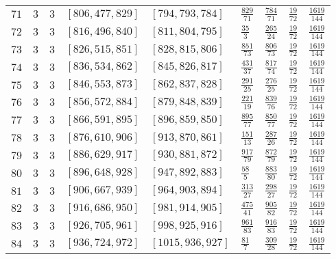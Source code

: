 \documentclass[12pt]{extarticle}
\begin{document}
\begin{longtable}{lllllllll}
$71$ & $3$ & $3$ & $\left[806, 477, 829\right]$ & $\left[794, 793, 784\right]$ & $\frac{829}{71}$ & $\frac{784}{71}$ & $\frac{19}{72}$ & $\frac{1619}{144}$ \\
$72$ & $3$ & $3$ & $\left[816, 496, 840\right]$ & $\left[811, 804, 795\right]$ & $\frac{35}{3}$ & $\frac{265}{24}$ & $\frac{19}{72}$ & $\frac{1619}{144}$ \\
$73$ & $3$ & $3$ & $\left[826, 515, 851\right]$ & $\left[828, 815, 806\right]$ & $\frac{851}{73}$ & $\frac{806}{73}$ & $\frac{19}{72}$ & $\frac{1619}{144}$ \\
$74$ & $3$ & $3$ & $\left[836, 534, 862\right]$ & $\left[845, 826, 817\right]$ & $\frac{431}{37}$ & $\frac{817}{74}$ & $\frac{19}{72}$ & $\frac{1619}{144}$ \\
$75$ & $3$ & $3$ & $\left[846, 553, 873\right]$ & $\left[862, 837, 828\right]$ & $\frac{291}{25}$ & $\frac{276}{25}$ & $\frac{19}{72}$ & $\frac{1619}{144}$ \\
$76$ & $3$ & $3$ & $\left[856, 572, 884\right]$ & $\left[879, 848, 839\right]$ & $\frac{221}{19}$ & $\frac{839}{76}$ & $\frac{19}{72}$ & $\frac{1619}{144}$ \\
$77$ & $3$ & $3$ & $\left[866, 591, 895\right]$ & $\left[896, 859, 850\right]$ & $\frac{895}{77}$ & $\frac{850}{77}$ & $\frac{19}{72}$ & $\frac{1619}{144}$ \\
$78$ & $3$ & $3$ & $\left[876, 610, 906\right]$ & $\left[913, 870, 861\right]$ & $\frac{151}{13}$ & $\frac{287}{26}$ & $\frac{19}{72}$ & $\frac{1619}{144}$ \\
$79$ & $3$ & $3$ & $\left[886, 629, 917\right]$ & $\left[930, 881, 872\right]$ & $\frac{917}{79}$ & $\frac{872}{79}$ & $\frac{19}{72}$ & $\frac{1619}{144}$ \\
$80$ & $3$ & $3$ & $\left[896, 648, 928\right]$ & $\left[947, 892, 883\right]$ & $\frac{58}{5}$ & $\frac{883}{80}$ & $\frac{19}{72}$ & $\frac{1619}{144}$ \\
$81$ & $3$ & $3$ & $\left[906, 667, 939\right]$ & $\left[964, 903, 894\right]$ & $\frac{313}{27}$ & $\frac{298}{27}$ & $\frac{19}{72}$ & $\frac{1619}{144}$ \\
$82$ & $3$ & $3$ & $\left[916, 686, 950\right]$ & $\left[981, 914, 905\right]$ & $\frac{475}{41}$ & $\frac{905}{82}$ & $\frac{19}{72}$ & $\frac{1619}{144}$ \\
$83$ & $3$ & $3$ & $\left[926, 705, 961\right]$ & $\left[998, 925, 916\right]$ & $\frac{961}{83}$ & $\frac{916}{83}$ & $\frac{19}{72}$ & $\frac{1619}{144}$ \\
$84$ & $3$ & $3$ & $\left[936, 724, 972\right]$ & $\left[1015, 936, 927\right]$ & $\frac{81}{7}$ & $\frac{309}{28}$ & $\frac{19}{72}$ & $\frac{1619}{144}$ \\

\end{longtable}
\end{document}

